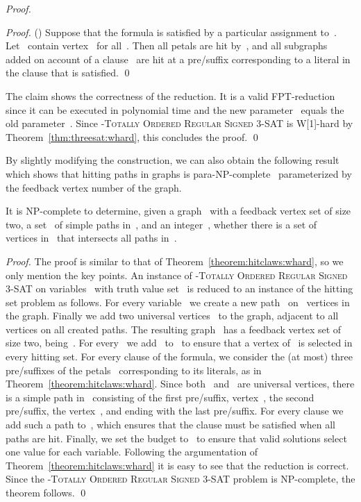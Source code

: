 \let\accentvec\vec  \documentclass{llncs}
\newcommand{\claimqed}{\renewcommand{\squareforqed}{}\qed\renewcommand{\squareforqed}{\plainsquareforqed}}
\newcommand{\SignedThreeSatn}{\textsc{-Totally Ordered Regular Signed 3-SAT}\xspace}
\begin{document}
\begin{proof}
\begin{proof}
() Suppose that the formula is satisfied by a particular assignment to~. Let~ contain vertex~ for all~. Then all petals are hit by~, and all subgraphs~ added on account of a clause~ are hit at a pre/suffix corresponding to a literal in the clause that is satisfied.
\claimqed
\end{proof}

The claim shows the correctness of the reduction. It is a valid FPT-reduction since it can be executed in polynomial time and the new parameter~ equals the old parameter~. Since \SignedThreeSatn is W[1]-hard by Theorem~\ref{thm:threesat:whard}, this concludes the proof.
\qed
\end{proof}

By slightly modifying the construction, we can also obtain the following result which shows that hitting paths in graphs is para-NP-complete~\cite{FlumG06} parameterized by the feedback vertex number of the graph.

\begin{theorem} \label{theorem:hitpaths:fvs:npc}
It is NP-complete to determine, given a graph~ with a feedback vertex set of size two, a set~ of simple paths in~, and an integer~, whether there is a set of~ vertices in~ that intersects all paths in~.
\end{theorem}
\begin{proof}
The proof is similar to that of Theorem~\ref{theorem:hitclaws:whard}, so we only mention the key points. An instance of \SignedThreeSatn on variables~ with truth value set~ is reduced to an instance of the hitting set problem as follows. For every variable~ we create a new path~ on~ vertices in the graph. Finally we add two universal vertices~ to the graph, adjacent to all vertices on all created paths. The resulting graph~ has a feedback vertex set of size two, being~. For every~ we add~ to~ to ensure that a vertex of~ is selected in every hitting set. For every clause of the formula, we consider the (at most) three pre/suffixes of the petals~ corresponding to its literals, as in Theorem~\ref{theorem:hitclaws:whard}. Since both~ and~ are universal vertices, there is a simple path in~ consisting of the first pre/suffix, vertex~, the second pre/suffix, the vertex~, and ending with the last pre/suffix. For every clause we add such a path to~, which ensures that the clause must be satisfied when all paths are hit. Finally, we set the budget to~ to ensure that valid solutions select one value for each variable. Following the argumentation of Theorem~\ref{theorem:hitclaws:whard} it is easy to see that the reduction is correct. Since the \SignedThreeSatn problem is NP-complete, the theorem follows.
\qed
\end{proof}
\end{document}
